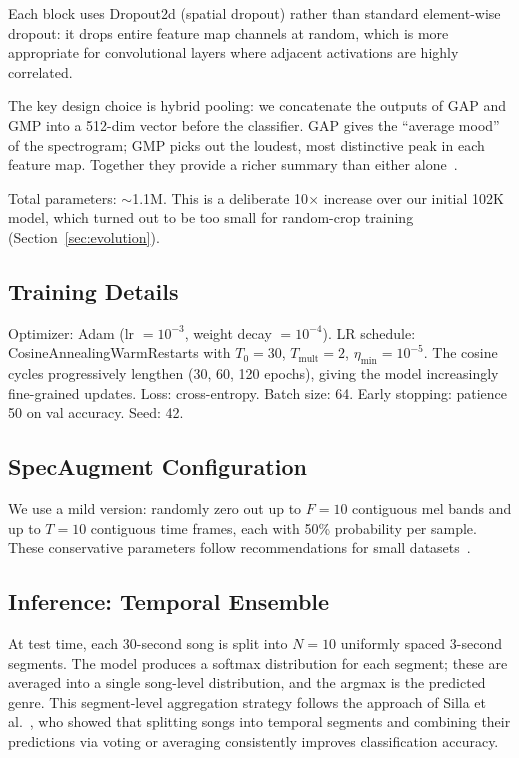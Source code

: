 Each block uses Dropout2d (spatial dropout) rather than standard element-wise dropout: it drops entire feature map channels at random, which is more appropriate for convolutional layers where adjacent activations are highly correlated.

The key design choice is hybrid pooling: we concatenate the outputs of GAP and GMP into a 512-dim vector before the classifier. GAP gives the ``average mood'' of the spectrogram; GMP picks out the loudest, most distinctive peak in each feature map. Together they provide a richer summary than either alone~\cite{woo2018cbam}.

Total parameters: $\sim$1.1M. This is a deliberate 10$\times$ increase over our initial 102K model, which turned out to be too small for random-crop training (Section~\ref{sec:evolution}).

\subsection{Training Details}

Optimizer: Adam (lr $= 10^{-3}$, weight decay $= 10^{-4}$). LR schedule: CosineAnnealingWarmRestarts with $T_0 = 30$, $T_{\text{mult}} = 2$, $\eta_{\min} = 10^{-5}$. The cosine cycles progressively lengthen (30, 60, 120 epochs), giving the model increasingly fine-grained updates. Loss: cross-entropy. Batch size: 64. Early stopping: patience 50 on val accuracy. Seed: 42.

\subsection{SpecAugment Configuration}

We use a mild version: randomly zero out up to $F=10$ contiguous mel bands and up to $T=10$ contiguous time frames, each with 50\% probability per sample. These conservative parameters follow recommendations for small datasets~\cite{park2019specaugment}.

\subsection{Inference: Temporal Ensemble}

At test time, each 30-second song is split into $N=10$ uniformly spaced 3-second segments. The model produces a softmax distribution for each segment; these are averaged into a single song-level distribution, and the argmax is the predicted genre. This segment-level aggregation strategy follows the approach of Silla et al.~\cite{silla2007ensemble}, who showed that splitting songs into temporal segments and combining their predictions via voting or averaging consistently improves classification accuracy.

